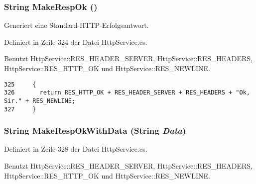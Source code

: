 \hypertarget{classQbeSAS_1_1HttpService_QbeSAS_1_1HttpServiced5}{
\subsubsection[MakeRespOk]{\setlength{\rightskip}{0pt plus 5cm}String Make\-Resp\-Ok ()}}
\label{classQbeSAS_1_1HttpService_QbeSAS_1_1HttpServiced5}


Generiert eine Standard-HTTP-Erfolgsantwort. 



Definiert in Zeile 324 der Datei Http\-Service.cs.

Benutzt Http\-Service::RES\_\-HEADER\_\-SERVER, Http\-Service::RES\_\-HEADERS, Http\-Service::RES\_\-HTTP\_\-OK und Http\-Service::RES\_\-NEWLINE.



\footnotesize\begin{verbatim}325     {
326       return RES_HTTP_OK + RES_HEADER_SERVER + RES_HEADERS + "Ok, Sir." + RES_NEWLINE;
327     }
\end{verbatim}\normalsize 
\hypertarget{classQbeSAS_1_1HttpService_QbeSAS_1_1HttpServiced6}{
\subsubsection[MakeRespOkWithData]{\setlength{\rightskip}{0pt plus 5cm}String Make\-Resp\-Ok\-With\-Data (String {\em Data})}}
\label{classQbeSAS_1_1HttpService_QbeSAS_1_1HttpServiced6}




Definiert in Zeile 328 der Datei Http\-Service.cs.

Benutzt Http\-Service::RES\_\-HEADER\_\-SERVER, Http\-Service::RES\_\-HEADERS, Http\-Service::RES\_\-HTTP\_\-OK und Http\-Service::RES\_\-NEWLINE.



